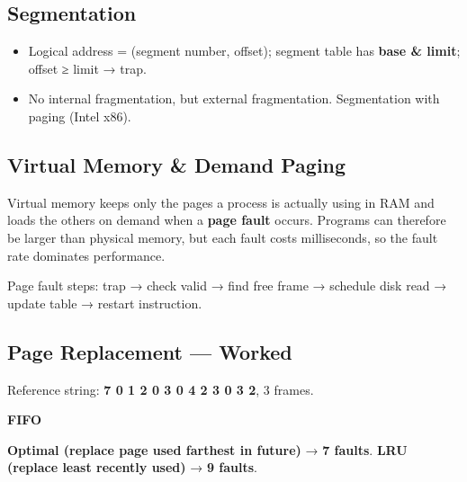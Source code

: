 \hypertarget{p2-05--73-segmentation}{%
\subsection{Segmentation}\label{p2-05--73-segmentation}}

\begin{itemize}
\tightlist
\item
  Logical address = (segment number, offset); segment table has \textbf{base \& limit}; offset ≥ limit → trap.
\item
  No internal fragmentation, but external fragmentation. Segmentation with paging (Intel x86).
\end{itemize}

\needspace{125pt}

\hypertarget{p2-05--74-virtual-memory--demand-paging}{%
\subsection{Virtual Memory \& Demand Paging}\label{p2-05--74-virtual-memory--demand-paging}}

Virtual memory keeps only the pages a process is actually using in RAM and loads the others on demand when
a \textbf{page fault} occurs. Programs can therefore be larger than physical memory, but each fault costs
milliseconds, so the fault rate dominates performance.



Page fault steps: trap → check valid → find free frame → schedule disk read → update table → restart instruction.

\needspace{155pt}

\hypertarget{p2-05--75-page-replacement--worked}{%
\subsection{Page Replacement --- Worked}\label{p2-05--75-page-replacement--worked}}

Reference string: \textbf{7 0 1 2 0 3 0 4 2 3 0 3 2}, 3 frames.

\textbf{FIFO}



\textbf{Optimal (replace page used farthest in future)} → \textbf{7 faults}.
\textbf{LRU (replace least recently used)} → \textbf{9 faults}.

